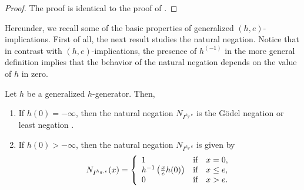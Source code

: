 \begin{proof}
	The proof is identical to the proof of \cite[Theorem 17]{Massanet2011A}.
\end{proof}
Hereunder, we recall some of the basic properties of generalized $(h,e)$-implications. First of all, the next result studies the natural negation. Notice that in contrast with $(h,e)$-implications, the presence of $h^{(-1)}$ in the more general definition implies that the behavior of the natural negation depends on the value of $h$ in zero.
\pagebreak
\begin{proposition}\label{prop:naturalnegation(h,e)}
	 Let $h$ be a generalized $h$-generator. Then,
	\begin{enumerate}[label=(\roman*)]
		\item If $h(0)=-\infty$, then the natural negation $N_{I^{h_g,e}}$ is the G\"odel negation or least negation \NDOne.
		\item If $h(0)>- \infty$, then the natural negation $N_{I^{h_g,e}}$ is given by
		$$N_{I^{h_g,e}}(x) = \left\{ \begin{array}{lcl}
			1 &   \hbox{if}  & x=0,\\
			h^{-1}\left(\frac{x}{e}h(0)\right) &  \hbox{if} & x \leq e, \\
			0 &  \hbox{if} & x>e.
		\end{array}
		\right.
		$$
	\end{enumerate}
	\label{negation(h,e)}
\end{proposition}
